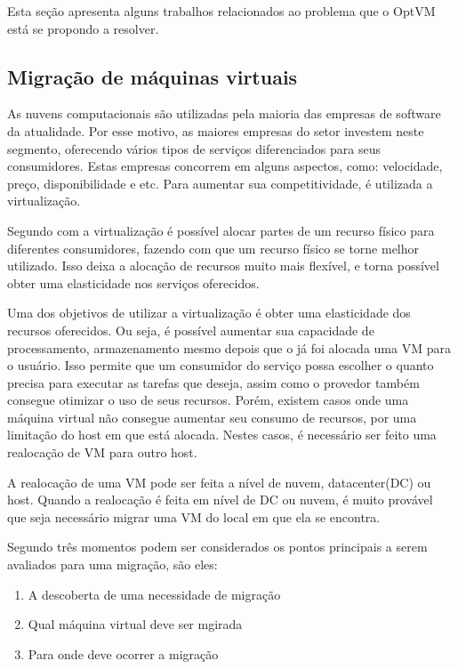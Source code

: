 Esta seção apresenta alguns trabalhos relacionados ao problema que o OptVM está
se propondo a resolver.

\subsection{Migração de máquinas virtuais}
As nuvens computacionais são utilizadas pela maioria das empresas de software da atualidade. 
Por esse motivo, as maiores empresas do setor investem neste segmento, 
oferecendo vários tipos de serviços diferenciados para seus consumidores. 
Estas empresas concorrem em alguns aspectos, como: velocidade, preço, disponibilidade e etc. 
Para aumentar sua competitividade, é utilizada a virtualização.

Segundo \cite{lopez2015virtual} com a virtualização é possível alocar partes de um recurso físico para 
diferentes consumidores, 
fazendo com que um recurso físico se torne melhor utilizado. Isso deixa a alocação de recursos
muito mais flexível, e torna possível obter uma elasticidade nos serviços oferecidos. 

Uma dos objetivos de utilizar a virtualização é obter uma elasticidade dos recursos oferecidos.
Ou seja, é possível aumentar sua capacidade de processamento, armazenamento mesmo depois que o
já foi alocada uma VM para o usuário.
Isso permite que um consumidor do  serviço possa escolher o quanto precisa para executar as 
tarefas que deseja, assim como o provedor também consegue otimizar o uso de seus recursos. Porém,
existem casos onde uma máquina virtual não consegue aumentar seu consumo de recursos, por uma limitação
do host em que está alocada. Nestes casos, é necessário ser feito uma realocação de VM para outro 
host.

A realocação de uma VM pode ser feita a nível de nuvem, datacenter(DC) ou host.
Quando a realocação é feita em nível de DC ou nuvem, é muito provável que seja 
necessário migrar uma VM do local em que ela se encontra. 

Segundo \cite{beloglazov2012energy} três momentos podem ser considerados os pontos principais a 
serem avaliados para uma migração, são eles:

\begin{enumerate}
\item A descoberta de uma necessidade de migração
\item Qual máquina virtual deve ser mgirada
\item Para onde deve ocorrer a migração
\end{enumerate}

